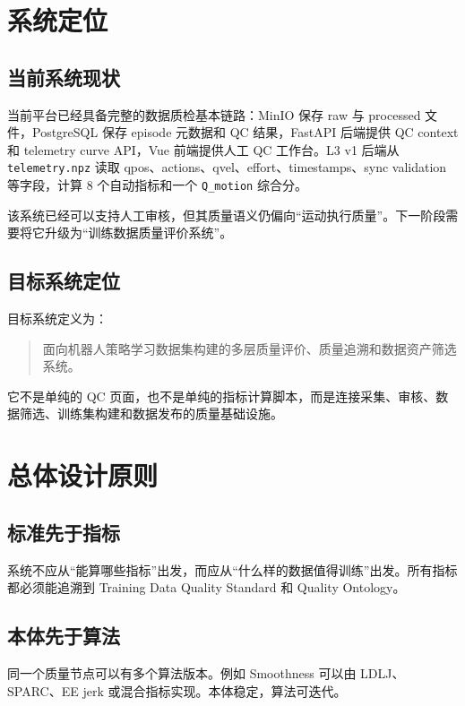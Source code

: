 \documentclass[UTF8,zihao=-4]{ctexart}
\newcommand{\Code}[1]{\texttt{#1}}
\begin{document}
\section{系统定位}

\subsection{当前系统现状}

当前平台已经具备完整的数据质检基本链路：MinIO 保存 raw 与 processed 文件，PostgreSQL 保存 episode 元数据和 QC 结果，FastAPI 后端提供 QC context 和 telemetry curve API，Vue 前端提供人工 QC 工作台。L3 v1 后端从 \Code{telemetry.npz} 读取 qpos、actions、qvel、effort、timestamps、sync validation 等字段，计算 8 个自动指标和一个 \Code{Q\_motion} 综合分。

该系统已经可以支持人工审核，但其质量语义仍偏向“运动执行质量”。下一阶段需要将它升级为“训练数据质量评价系统”。

\subsection{目标系统定位}

目标系统定义为：
\begin{quote}
面向机器人策略学习数据集构建的多层质量评价、质量追溯和数据资产筛选系统。
\end{quote}

它不是单纯的 QC 页面，也不是单纯的指标计算脚本，而是连接采集、审核、数据筛选、训练集构建和数据发布的质量基础设施。

\section{总体设计原则}

\subsection{标准先于指标}

系统不应从“能算哪些指标”出发，而应从“什么样的数据值得训练”出发。所有指标都必须能追溯到 Training Data Quality Standard 和 Quality Ontology。

\subsection{本体先于算法}

同一个质量节点可以有多个算法版本。例如 Smoothness 可以由 LDLJ、SPARC、EE jerk 或混合指标实现。本体稳定，算法可迭代。
\end{document}
